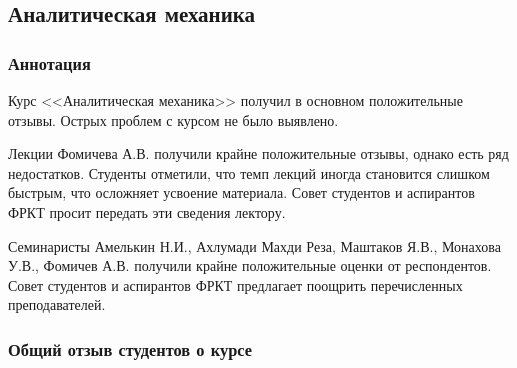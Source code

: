 \subsection{Аналитическая механика}
	
	\subsubsection{Аннотация}

		Курс <<Аналитическая механика>> получил в основном положительные отзывы. Острых проблем с курсом не было выявлено.

		Лекции Фомичева А.В. получили крайне положительные отзывы, однако есть ряд недостатков. Студенты отметили, что темп лекций иногда становится слишком быстрым, что осложняет усвоение материала. Совет студентов и аспирантов ФРКТ просит передать эти сведения лектору.

        Семинаристы Амелькин Н.И., Ахлумади Махди Реза, Маштаков Я.В., Монахова У.В., Фомичев А.В. получили крайне положительные оценки от респондентов. Совет студентов и аспирантов ФРКТ предлагает поощрить перечисленных преподавателей.



	\subsubsection{Общий отзыв студентов о курсе}

